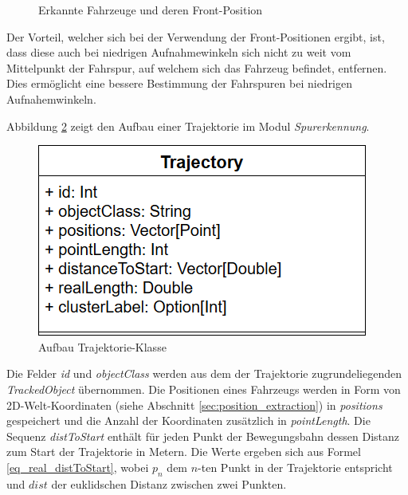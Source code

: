 \begin{figure}[H]
    \centering
    \qquad \qquad \qquad
    \caption{Erkannte Fahrzeuge und deren Front-Position}
    \label{fig:real1_tracked_object_front_position}
\end{figure}

Der Vorteil, welcher sich bei der Verwendung der Front-Positionen ergibt, ist, dass diese auch bei niedrigen
Aufnahmewinkeln sich nicht zu weit vom Mittelpunkt der Fahrspur, auf welchem sich das Fahrzeug befindet, entfernen.
Dies ermöglicht eine bessere Bestimmung der Fahrspuren bei niedrigen Aufnahemwinkeln.

Abbildung \ref{fig:real_trajectory_classDia} zeigt den Aufbau einer Trajektorie im Modul \textit{Spurerkennung}.

\begin{figure}[H]
\centering
    \includegraphics[width=0.38\linewidth]{resources/img/umsetzung/U1/Trajectory_ClassDia}
\caption{Aufbau Trajektorie-Klasse}
\label{fig:real_trajectory_classDia}
\end{figure}

Die Felder \textit{id} und \textit{objectClass} werden aus dem der Trajektorie zugrundeliegenden \textit{TrackedObject}
übernommen.
Die Positionen eines Fahrzeugs werden in Form von 2D-Welt-Koordinaten (siehe Abschnitt \ref{sec:position_extraction})
in \textit{positions} gespeichert und die Anzahl der Koordinaten zusätzlich in \textit{pointLength}.
Die Sequenz \textit{distToStart} enthält für jeden Punkt der Bewegungsbahn dessen Distanz zum Start der Trajektorie in Metern.
Die Werte ergeben sich aus Formel \ref{eq_real_distToStart}, wobei $p_n$ dem $n$-ten Punkt in der Trajektorie entspricht
und $dist$ der euklidschen Distanz zwischen zwei Punkten.

